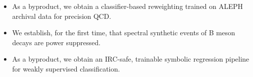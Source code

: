 \begin{itemize}
  \item As a byproduct, we obtain a classifier-based reweighting trained on ALEPH archival data for precision QCD.
  \item We establish, for the first time, that spectral synthetic events of B meson decays are power suppressed.
  \item As a byproduct, we obtain an IRC-safe, trainable symbolic regression pipeline for weakly supervised classification.
\end{itemize}

